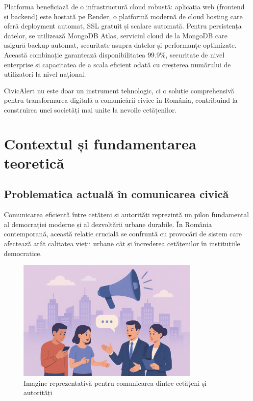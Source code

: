 \documentclass[12pt,a4paper]{report}
\begin{document}
Platforma beneficiază de o infrastructură cloud robustă: aplicația web (frontend și backend) este hostată pe Render, o platformă modernă de cloud hosting care oferă deployment automat, SSL gratuit și scalare automată. Pentru persistența datelor, se utilizează MongoDB Atlas, serviciul cloud de la MongoDB care asigură backup automat, securitate asupra datelor și performanțe optimizate. Această combinație garantează disponibilitatea 99.9\%, securitate de nivel enterprise și capacitatea de a scala eficient odată cu creșterea numărului de utilizatori la nivel național.

CivicAlert nu este doar un instrument tehnologic, ci o soluție comprehensivă pentru transformarea digitală a comunicării civice în România, contribuind la construirea unei societăți mai unite la nevoile cetățenilor.


\newpage
\chapter{Contextul și fundamentarea teoretică}

\section{Problematica actuală în comunicarea civică}

Comunicarea eficientă între cetățeni și autorități reprezintă un pilon fundamental al democrației moderne și al dezvoltării urbane durabile. În România contemporană, această relație crucială se confruntă cu provocări de sistem care afectează atât calitatea vieții urbane cât și încrederea cetățenilor în instituțiile democratice.

\begin{figure}[H]
    \centering
    \includegraphics[width=0.8\textwidth]{problema in comunicare.png}
    \caption{Imagine reprezentativă pentru comunicarea dintre cetățeni și autorități}
    \label{fig:problema_comunicare}
\end{figure}
\end{document}
